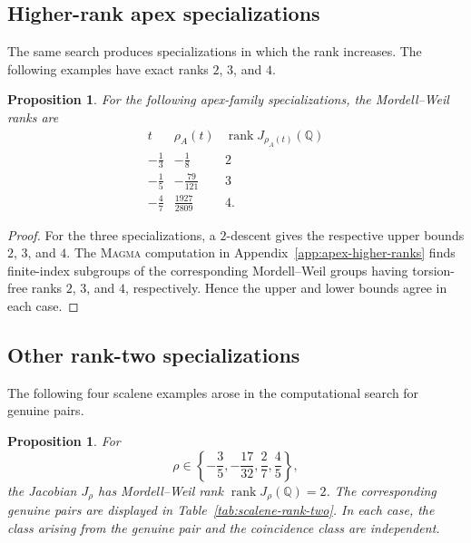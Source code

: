 \documentclass[11pt]{amsart}
\theoremstyle{plain}
\newtheorem{prop}[thm]{Proposition}
\theoremstyle{remark}
\theoremstyle{plain}
\newcommand{\Q}{\mathbb{Q}}
\begin{document}
\subsection{Higher-rank apex specializations}

The same search produces specializations in which the rank increases.
The following examples have exact ranks $2$, $3$, and $4$.


\begin{prop}\label{prop:apex-higher-ranks}
For the following apex-family specializations, the Mordell--Weil ranks
are
\[
\begin{array}{c|c|c}
t & \rho_A(t) & \operatorname{rank}J_{\rho_A(t)}(\Q)\\
\hline
-\frac13 & -\frac18 & 2\\[1mm]
-\frac15 & -\frac{79}{121} & 3\\[1mm]
-\frac47 & \frac{1927}{2809} & 4.
\end{array}
\]
\end{prop}

\begin{proof}
For the three specializations, a $2$-descent gives the respective
upper bounds $2$, $3$, and $4$. The \textsc{Magma} computation in
Appendix~\ref{app:apex-higher-ranks} finds finite-index subgroups of
the corresponding Mordell--Weil groups having torsion-free ranks
$2$, $3$, and $4$, respectively. Hence the upper and lower bounds
agree in each case.
\end{proof}


\subsection{Other rank-two specializations}

The following four scalene examples arose in the computational search
for genuine pairs.

\begin{prop}\label{prop:scalene-rank-two}
For
\[
\rho\in
\left\{
-\frac35,-\frac{17}{32},\frac27,\frac45
\right\},
\]
the Jacobian $J_\rho$ has Mordell--Weil rank
$\operatorname{rank}J_\rho(\Q)=2$.
The corresponding genuine pairs are displayed in
Table~\ref{tab:scalene-rank-two}. In each case, the class arising from
the genuine pair and the coincidence class are independent.
\end{prop}
\end{document}
